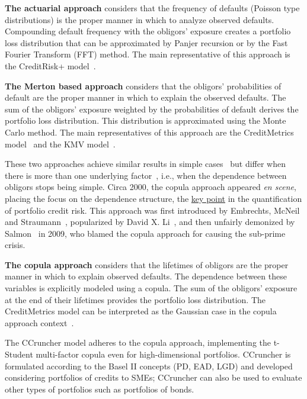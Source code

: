 \documentclass[11pt,fleqn]{book} %
\begin{document}
\textbf{The actuarial approach} considers that the frequency of defaults 
(Poisson type distributions) is the proper manner in which to analyze observed 
defaults. Compounding default frequency with the obligors' exposure creates a
portfolio loss distribution that can be approximated by Panjer recursion or 
by the Fast Fourier Transform (FFT) method. The main representative of this 
approach is the CreditRisk+ model~\cite{creditrisk+:1997}.

\textbf{The Merton based approach} considers that the obligors' probabilities 
of default are the proper manner in which to explain the observed defaults.
The sum of the obligors' exposure weighted by the probabilities of default 
derives the portfolio loss distribution. This distribution is approximated 
using the Monte Carlo method. The main representatives of this approach are the 
CreditMetrics\texttrademark{} model~\cite{cmetrics:1997} and the KMV 
model~\cite{kmv:2003}. 

These two approaches achieve similar results in simple cases~\cite{koyluoglu:1998}
but differ when there is more than one underlying factor~\cite{bluhm:2001}, 
i.e., when the dependence between obligors stops being simple.
Circa 2000, the copula approach appeared \textit{en scene}, placing the focus 
on the dependence structure, the \underline{key point} in the quantification of
portfolio credit risk. This approach was first introduced by Embrechts, McNeil 
and Straumann~\cite{embrechts:2002}, popularized by David X. Li~\cite{li:2000}, 
and then unfairly demonized by Salmon~\cite{salmon:2009} in 2009, who blamed 
the copula approach for causing the sub-prime crisis.

\textbf{The copula approach} considers that the lifetimes of obligors are
the proper manner in which to explain observed defaults. The dependence between 
these variables is explicitly modeled using a copula. The sum of the obligors' 
exposure at the end of their lifetimes provides the portfolio loss 
distribution. The CreditMetrics\texttrademark{} model can be interpreted as 
the Gaussian case in the copula approach context~\cite{li:2000}.

The CCruncher model adheres to the copula approach, implementing the 
t-Student multi-factor copula even for high-dimensional portfolios. 
CCruncher is formulated according to the Basel II concepts (PD, EAD, LGD) 
and developed considering portfolios of credits to SMEs; CCruncher can also 
be used to evaluate other types of portfolios such as portfolios of bonds.
\end{document}
